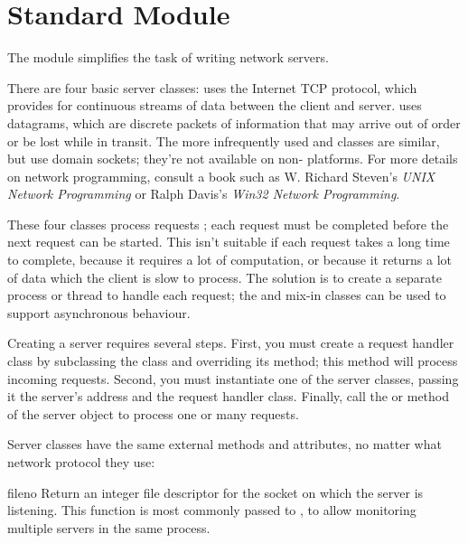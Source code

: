 \section{Standard Module }
\label{module-SocketServer}

The  module simplifies the task of writing network
servers.

There are four basic server classes:  uses the
Internet TCP protocol, which provides for continuous streams of data
between the client and server.   uses datagrams, which
are discrete packets of information that may arrive out of order or be
lost while in transit.  The more infrequently used
 and  classes are
similar, but use \UNIX{} domain sockets; they're not available on
non-\UNIX{} platforms.  For more details on network programming, consult
a book such as W. Richard Steven's \emph{UNIX Network Programming}
or Ralph Davis's \emph{Win32 Network Programming}.

These four classes process requests ; each request
must be completed before the next request can be started.  This isn't
suitable if each request takes a long time to complete, because it
requires a lot of computation, or because it returns a lot of data
which the client is slow to process.  The solution is to create a
separate process or thread to handle each request; the
 and  mix-in classes can be
used to support asynchronous behaviour.

Creating a server requires several steps.  First, you must create a
request handler class by subclassing the 
class and overriding its  method; this method will
process incoming requests.  Second, you must instantiate one of the
server classes, passing it the server's address and the request
handler class.  Finally, call the  or
 method of the server object to process one or
many requests.

Server classes have the same external methods and attributes, no
matter what network protocol they use:



\begin{funcdesc}{fileno}{}
Return an integer file descriptor for the socket on which the server
is listening.  This function is most commonly passed to
, to allow monitoring multiple servers in the
same process.
\end{funcdesc}

